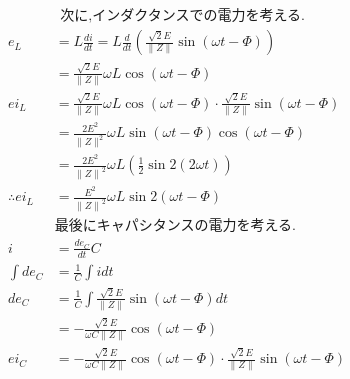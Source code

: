 \documentclass[twocolumn]{article}
\begin{document}
\begin{enumerate}
\begin{align*}
                          & \text{次に,インダクタンスでの電力を考える.}
        \end{align*}
        \begin{align*}
          e_L             & = L \frac{di}{dt} = L \frac{d}{dt} \left( \frac{\sqrt{2}E}{\|Z\|}\sin \left( \omega t - \Phi\right)\right)                          \\
                          & = \frac{\sqrt{2}E}{\|Z\|}\omega L \cos \left(\omega t - \Phi\right)                                                                 \\
          ei_L            & = \frac{\sqrt{2}E}{\|Z\|}\omega L \cos \left(\omega t - \Phi\right) \cdot \frac{\sqrt{2}E}{\|Z\|}\sin \left( \omega t - \Phi\right) \\
                          & = \frac{2E^2}{{\|Z\|^2}}\omega L \sin \left(\omega t - \Phi\right) \cos \left(\omega t - \Phi\right)                                \\
                          & = \frac{2E^2}{{\|Z\|}^2}\omega L \left(\frac{1}{2}\sin2\left(2\omega t\right)\right)                                                \\
          \therefore ei_L & = \frac{E^2}{{\|Z\|}^2}\omega L \sin2\left(\omega t - \Phi\right)                                                                   \\
                          & \text{最後にキャパシタンスの電力を考える.}                                                                                                           \\
          i               & = \frac{de_C}{dt}C                                                                                                                  \\
          \int de_C       & = \frac{1}{C} \int i dt                                                                                                             \\
          de_C            & = \frac{1}{C} \int \frac{\sqrt{2}E}{\|Z\|}\sin \left(\omega t - \Phi\right) dt                                                      \\
                          & = -\frac{\sqrt{2}E}{\omega C \|Z\|}\cos\left(\omega t - \Phi\right)                                                                 \\
          ei_C            & = -\frac{\sqrt{2}E}{\omega C \|Z\|}\cos\left(\omega t - \Phi\right) \cdot \frac{\sqrt{2}E}{\|Z\|}\sin \left(\omega t - \Phi\right)  \\

\end{align*}
\end{enumerate}
\end{document}
